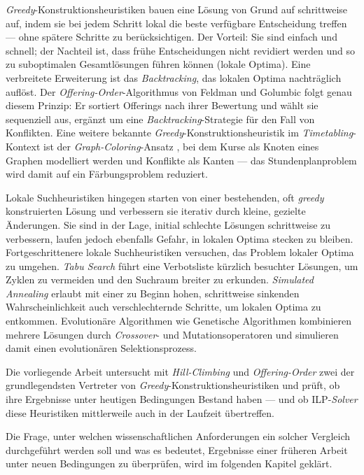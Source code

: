 \textit{Greedy}-Konstruktionsheuristiken bauen eine Lösung von Grund auf schrittweise auf, indem sie bei jedem Schritt lokal die beste verfügbare Entscheidung treffen --- ohne spätere Schritte zu berücksichtigen. Der Vorteil: Sie sind einfach und schnell; der Nachteil ist, dass frühe Entscheidungen nicht revidiert werden und so zu suboptimalen Gesamtlösungen führen können (lokale Optima). Eine verbreitete Erweiterung ist das \textit{Backtracking}, das lokalen Optima nachträglich auflöst. Der \textit{Offering-Order}-Algorithmus von Feldman und Golumbic \cite{feldmangolumbic} folgt genau diesem Prinzip: Er sortiert Offerings nach ihrer Bewertung und wählt sie sequenziell aus, ergänzt um eine \textit{Backtracking}-Strategie für den Fall von Konflikten. Eine weitere bekannte \textit{Greedy}-Konstruktionsheuristik im \textit{Timetabling}-Kontext ist der \textit{Graph-Coloring}-Ansatz \cite{carter-1996}, bei dem Kurse als Knoten eines Graphen modelliert werden und Konflikte als Kanten --- das Stundenplanproblem wird damit auf ein Färbungsproblem reduziert.

Lokale Suchheuristiken hingegen starten von einer bestehenden, oft \textit{greedy} konstruierten Lösung und verbessern sie iterativ durch kleine, gezielte Änderungen. Sie sind in der Lage, initial schlechte Lösungen schrittweise zu verbessern, laufen jedoch ebenfalls Gefahr, in lokalen Optima stecken zu bleiben. Fortgeschrittenere lokale Suchheuristiken versuchen, das Problem lokaler Optima zu umgehen. \textit{Tabu Search} \cite{chen-2021} führt eine Verbotsliste kürzlich besuchter Lösungen, um Zyklen zu vermeiden und den Suchraum breiter zu erkunden. \textit{Simulated Annealing} \cite{ceschia-2022} erlaubt mit einer zu Beginn hohen, schrittweise sinkenden Wahrscheinlichkeit auch verschlechternde Schritte, um lokalen Optima zu entkommen. Evolutionäre Algorithmen wie Genetische Algorithmen \cite{chen-2021} kombinieren mehrere Lösungen durch \textit{Crossover}- und Mutationsoperatoren und simulieren damit einen evolutionären Selektionsprozess.

Die vorliegende Arbeit untersucht mit \textit{Hill-Climbing} und \textit{Offering-Order} zwei der grundlegendsten Vertreter von \textit{Greedy}-Konstruktionsheuristiken und prüft, ob ihre Ergebnisse unter heutigen Bedingungen Bestand haben --- und ob ILP-\textit{Solver} diese Heuristiken mittlerweile auch in der Laufzeit übertreffen.

Die Frage, unter welchen wissenschaftlichen Anforderungen ein solcher Vergleich durchgeführt werden soll und was es bedeutet, Ergebnisse einer früheren Arbeit unter neuen Bedingungen zu überprüfen, wird im folgenden Kapitel geklärt.





